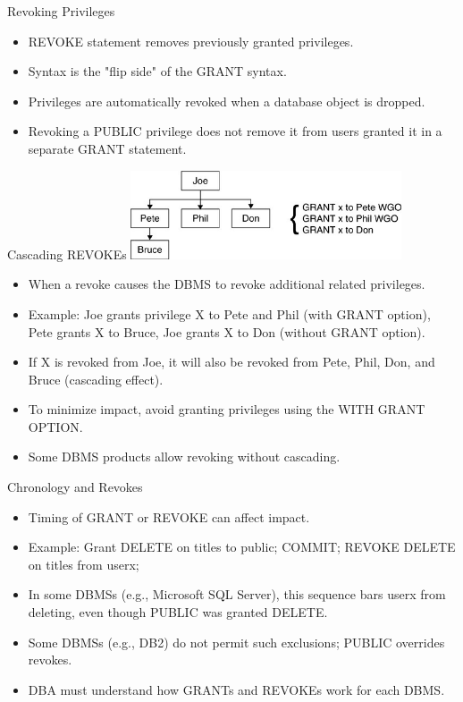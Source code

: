 \documentclass{beamer}
\begin{document}
\begin{frame}{Revoking Privileges}
    \begin{itemize}
        \item REVOKE statement removes previously granted privileges.
        \item Syntax is the "flip side" of the GRANT syntax.
        \item Privileges are automatically revoked when a database object is dropped.
        \item Revoking a PUBLIC privilege does not remove it from users granted it in a separate GRANT statement.
    \end{itemize}
\end{frame}

\begin{frame}{Cascading REVOKEs}
    \centering
    \includegraphics[width=0.6\textwidth]{figures/cascading_revokes}
    \begin{itemize}
        \item When a revoke causes the DBMS to revoke additional related privileges.
        \item Example: Joe grants privilege X to Pete and Phil (with GRANT option), Pete grants X to Bruce, Joe grants X to Don (without GRANT option).
        \item If X is revoked from Joe, it will also be revoked from Pete, Phil, Don, and Bruce (cascading effect).
        \item To minimize impact, avoid granting privileges using the WITH GRANT OPTION.
        \item Some DBMS products allow revoking without cascading.
    \end{itemize}
\end{frame}

\begin{frame}{Chronology and Revokes}
    \begin{itemize}
        \item Timing of GRANT or REVOKE can affect impact.
        \item Example: Grant DELETE on titles to public; COMMIT; REVOKE DELETE on titles from userx;
        \item In some DBMSs (e.g., Microsoft SQL Server), this sequence bars userx from deleting, even though PUBLIC was granted DELETE.
        \item Some DBMSs (e.g., DB2) do not permit such exclusions; PUBLIC overrides revokes.
        \item DBA must understand how GRANTs and REVOKEs work for each DBMS.
    \end{itemize}
\end{frame}
\end{document}

